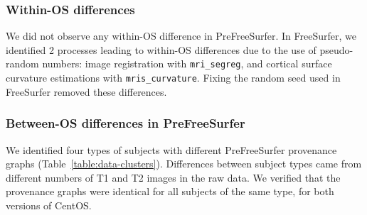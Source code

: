 \documentclass[a4paper,num-refs]{oup-contemporary}
\newcommand{\tristan}[1]{\color{orange}\textbf{From Tristan:}#1\color{black}}
\begin{document}
\subsubsection{Within-OS differences}

We did not observe any within-OS difference in PreFreeSurfer. In
FreeSurfer, we identified 2 processes leading to within-OS differences due
to the use of pseudo-random numbers: image registration with
\texttt{mri\_segreg}, and cortical surface curvature estimations with
\texttt{mris\_curvature}. Fixing the random seed used in FreeSurfer removed
these differences.








\subsubsection{Between-OS differences in PreFreeSurfer}

We identified four types of subjects with different PreFreeSurfer
provenance graphs (Table~\ref{table:data-clusters}). Differences between
subject types came from different numbers of T1 and T2 images in the
raw data. We verified that
the provenance graphs were identical for all subjects of the same type, for
both versions of CentOS.
\end{document}
